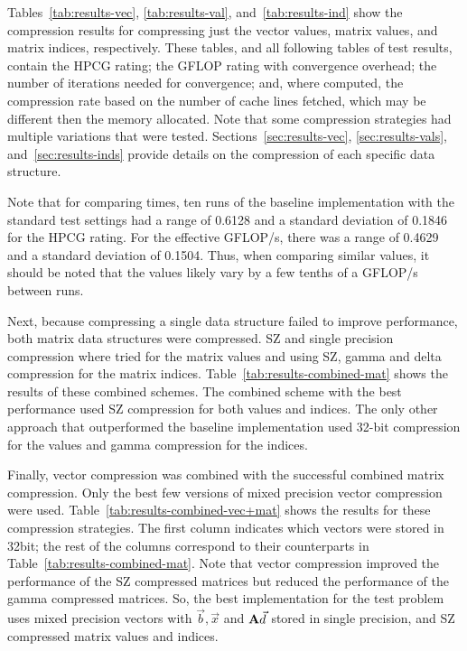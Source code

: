 Tables~\ref{tab:results-vec}, \ref{tab:results-val}, and~\ref{tab:results-ind} show the compression results for compressing just the vector values, matrix values, and matrix indices, respectively.
These tables, and all following tables of test results, contain the HPCG rating; the GFLOP rating with convergence overhead; the number of iterations needed for convergence; and, where computed, the compression rate based on the number of cache lines fetched, which may be different then the memory allocated.
Note that some compression strategies had multiple variations that were tested.
Sections~\ref{sec:results-vec}, \ref{sec:results-vals}, and~\ref{sec:results-inds} provide details on the compression of each specific data structure.

Note that for comparing times, ten runs of the baseline implementation with the standard test settings had a range of 0.6128 and a standard deviation of 0.1846 for the HPCG rating.
For the effective GFLOP/s, there was a range of 0.4629 and a standard deviation of 0.1504.
Thus, when comparing similar values, it should be noted that the values likely vary by a few tenths of a GFLOP/s between runs.

Next, because compressing a single data structure failed to improve performance, both matrix data structures were compressed.
SZ and single precision compression where tried for the matrix values and using SZ, gamma and delta compression for the matrix indices.
Table~\ref{tab:results-combined-mat} shows the results of these combined schemes.
The combined scheme with the best performance used SZ compression for both values and indices.
The only other approach that outperformed the baseline implementation used 32-bit compression for the values and gamma compression for the indices.

Finally, vector compression was combined with the successful combined matrix compression.
Only the best few versions of mixed precision vector compression were used.
Table~\ref{tab:results-combined-vec+mat} shows the results for these compression strategies.
The first column indicates which vectors were stored in 32bit; the rest of the columns correspond to their counterparts in Table~\ref{tab:results-combined-mat}.
Note that vector compression improved the performance of the SZ compressed matrices but reduced the performance of the gamma compressed matrices.
So, the best implementation for the test problem uses mixed precision vectors with \(\vec{b}, \vec{x}\) and \(\mathbf{A}\vec{d}\) stored in single precision, and SZ compressed matrix values and indices.

